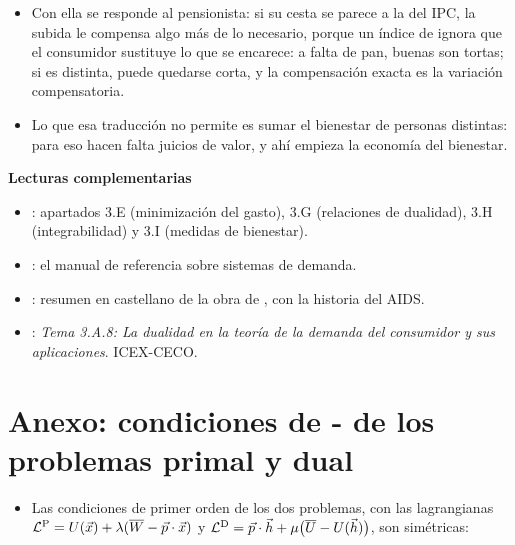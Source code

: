 \documentclass[11pt]{article}
\begin{document}
\begin{itemize}
\begin{itemize}
  \item Con ella se responde al pensionista: si su cesta se parece a la del IPC, la subida le compensa algo más de lo necesario, porque un índice de  ignora que el consumidor sustituye lo que se encarece: a falta de pan, buenas son tortas; si es distinta, puede quedarse corta, y la compensación exacta es la variación compensatoria.

  \item Lo que esa traducción no permite es sumar el bienestar de personas distintas: para eso hacen falta juicios de valor, y ahí empieza la economía del bienestar.
  \end{itemize}
\end{itemize}

\begin{anotaciones}
\textbf{Lecturas complementarias}
\begin{itemize}
\item \textcite[cap.~3]{MasColellWhinstonGreen1995}: apartados 3.E (minimización del gasto), 3.G (relaciones de dualidad), 3.H (integrabilidad) y 3.I (medidas de bienestar).
\item \textcite{DeatonMuellbauer1980Economics}: el manual de referencia sobre sistemas de demanda.
\item \textcite{AguilarMateos2015Deaton}: resumen en castellano de la obra de , con la historia del AIDS.
\item \textcite{RodriguezLopez2018Dualidad}: \emph{Tema 3.A.8: La dualidad en la teoría de la demanda del consumidor y sus aplicaciones}. ICEX-CECO.
\end{itemize}
\end{anotaciones}

\clearpage
\appendix

\section{Anexo: condiciones de -\cortetitulo{} de los problemas primal y dual}\label{anexo:kt}

\begin{itemize}
\item Las condiciones de primer orden de los dos problemas, con las lagrangianas $\mathcal{L}^{\mathrm{P}}=U(\vec{x})+\lambda(\overline{W}-\vec{p}\cdot\vec{x})$ y $\mathcal{L}^{\mathrm{D}}=\vec{p}\cdot\vec{h}+\mu\big(\overline{U}-U(\vec{h})\big)$, son simétricas:
\end{itemize}
\end{document}

